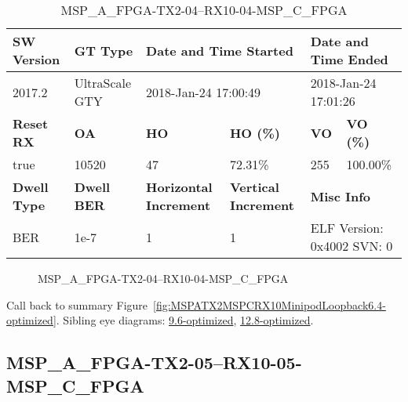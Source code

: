 \begin{table}[h]
\centering
\caption{MSP\_A\_FPGA-TX2-04--RX10-04-MSP\_C\_FPGA}
\label{tab:MSPAFPGATX204RX1004MSPCFPGA6.4-optimized}
\begin{tabular}{@{}|l|l|l|l|l|l|@{}}
\toprule
\textbf{SW Version}                & \textbf{GT Type}   & \multicolumn{2}{l|}{\textbf{Date and Time Started}}            & \multicolumn{2}{l|}{\textbf{Date and Time Ended}}        \\ \midrule
2017.2                       & UltraScale GTY          & \multicolumn{2}{l|}{2018-Jan-24 17:00:49}                   & \multicolumn{2}{l|}{2018-Jan-24 17:01:26}               \\ \midrule
\textbf{Reset RX}                  & \textbf{OA} & \textbf{HO}   & \textbf{HO (\%)} & \textbf{VO} & \textbf{VO (\%)} \\ \midrule
true & 10520        & 47          & 72.31\%        & 255        & 100.00\%       \\ \midrule
\textbf{Dwell Type}                & \textbf{Dwell BER} & \textbf{Horizontal Increment} & \textbf{Vertical Increment}    & \multicolumn{2}{l|}{\textbf{Misc Info}}                  \\ \midrule
BER                            & 1e-7        & 1        & 1           & \multicolumn{2}{l|}{ELF Version: 0x4002 SVN: 0}                         \\ \bottomrule
\end{tabular}
\end{table}

\begin{figure}[h]
\caption{MSP\_A\_FPGA-TX2-04--RX10-04-MSP\_C\_FPGA} \label{fig:MSPAFPGATX204RX1004MSPCFPGA6.4-optimized}
\end{figure}

Call back to summary Figure~\ref{fig:MSPATX2MSPCRX10MinipodLoopback6.4-optimized}.
Sibling eye diagrams: \hyperref[sec:MSPAFPGATX204RX1004MSPCFPGA9.6-optimized]{9.6-optimized}, \hyperref[sec:MSPAFPGATX204RX1004MSPCFPGA12.8-optimized]{12.8-optimized}.

\clearpage
\newpage


\subsection{MSP\_A\_FPGA-TX2-05--RX10-05-MSP\_C\_FPGA}\label{sec:MSPAFPGATX205RX1005MSPCFPGA6.4-optimized}

